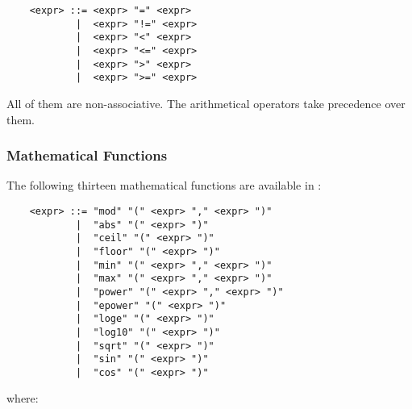 	\begin{verbatim}
    <expr> ::= <expr> "=" <expr>
            |  <expr> "!=" <expr>
            |  <expr> "<" <expr>
            |  <expr> "<=" <expr>
            |  <expr> ">" <expr>
            |  <expr> ">=" <expr>
	\end{verbatim}

\noindent All of them are non-associative. The arithmetical operators take precedence over them.


\subsubsection{Mathematical Functions}

The following thirteen mathematical functions are available in \aemilia:

	\begin{verbatim}
    <expr> ::= "mod" "(" <expr> "," <expr> ")"
            |  "abs" "(" <expr> ")"
            |  "ceil" "(" <expr> ")"
            |  "floor" "(" <expr> ")"
            |  "min" "(" <expr> "," <expr> ")"
            |  "max" "(" <expr> "," <expr> ")"
            |  "power" "(" <expr> "," <expr> ")"
            |  "epower" "(" <expr> ")"
            |  "loge" "(" <expr> ")"
            |  "log10" "(" <expr> ")"
            |  "sqrt" "(" <expr> ")"
            |  "sin" "(" <expr> ")"
            |  "cos" "(" <expr> ")"
	\end{verbatim}

\noindent where:

